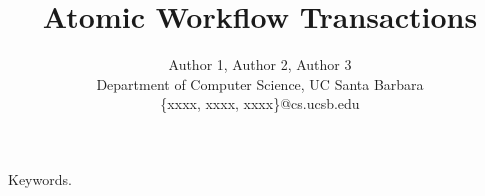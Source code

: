 \documentclass[10pt, conference]{IEEEtran}
\title{Atomic Workflow Transactions}
\author{Author 1, Author 2, Author 3\\
  Department of Computer Science, UC Santa Barbara\\
  \{xxxx, xxxx, xxxx\}@cs.ucsb.edu}
\begin{document}
\maketitle

\begin{abstract}

\end{abstract}

\begin{keywords}
	Keywords.
\end{keywords}









 





\end{document}
